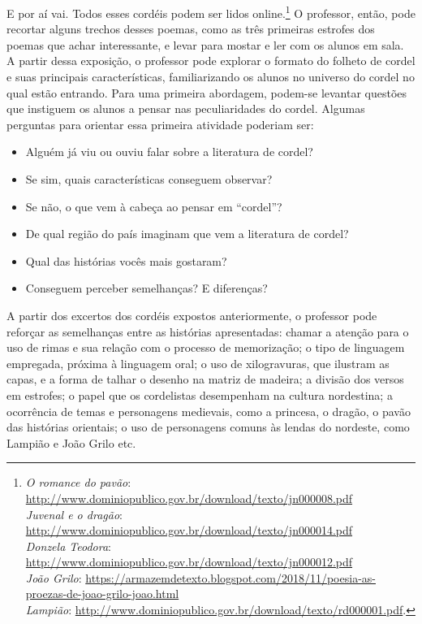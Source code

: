 \documentclass[11pt]{extarticle}
\begin{document}
E por aí vai. Todos esses cordéis podem ser lidos
online.\footnote{\textit{O romance do pavão}: \url{http://www.dominiopublico.gov.br/download/texto/jn000008.pdf}\\
\textit{Juvenal e o dragão}: \url{http://www.dominiopublico.gov.br/download/texto/jn000014.pdf}\\
\textit{Donzela Teodora}: \url{http://www.dominiopublico.gov.br/download/texto/jn000012.pdf}\\
\textit{João Grilo}: \url{https://armazemdetexto.blogspot.com/2018/11/poesia-as-proezas-de-joao-grilo-joao.html}\\
\textit{Lampião}: \url{http://www.dominiopublico.gov.br/download/texto/rd000001.pdf}.}
O professor, então, pode recortar alguns trechos desses poemas, como as três primeiras estrofes dos poemas que achar interessante, e levar para mostar e ler com os alunos em sala.
A partir dessa exposição, o professor pode explorar o formato do folheto de cordel e suas principais características, familiarizando os alunos no universo do cordel no qual estão entrando. 
Para uma primeira abordagem, podem-se levantar questões que instiguem os alunos a pensar nas peculiaridades do cordel.
Algumas perguntas para orientar essa primeira atividade poderiam ser:

\begin{itemize}
\item Alguém já viu ou ouviu falar sobre a literatura de cordel?

\item Se sim, quais características conseguem observar?

\item Se não, o que vem à cabeça ao pensar em ``cordel''?

\item De qual região do país imaginam que vem a literatura de cordel?

\item Qual das histórias vocês mais gostaram?

\item Conseguem perceber semelhanças? E diferenças?
\end{itemize}

A partir dos excertos dos cordéis expostos anteriormente, o professor pode reforçar as semelhanças entre as histórias apresentadas: chamar a atenção para o uso de rimas e sua relação com o processo de memorização; o tipo de linguagem empregada, próxima à linguagem oral; o uso de xilogravuras, que ilustram as capas, e a forma de talhar o desenho na matriz de madeira; a divisão dos versos em estrofes; o papel que os cordelistas desempenham na cultura nordestina; a ocorrência de temas e personagens medievais, como a princesa, o dragão, o pavão das histórias orientais; o uso de personagens comuns às lendas do nordeste, como Lampião e João Grilo etc.
\end{document}
